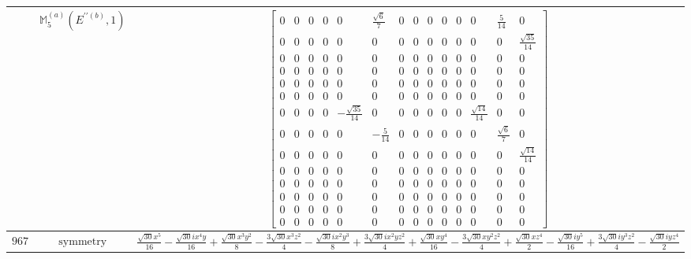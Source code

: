 \documentclass[fleqn,8pt,landscape]{jsarticle}
\begin{document}
\begin{longtable}{ccc}
$  $ & $ \mathbb{M}_{5}^{(a)}(E^{\prime\prime(b)},1) $ & $ \begin{bmatrix} 0 & 0 & 0 & 0 & 0 & \frac{\sqrt{6}}{7} & 0 & 0 & 0 & 0 & 0 & 0 & \frac{5}{14} & 0 \\ 0 & 0 & 0 & 0 & 0 & 0 & 0 & 0 & 0 & 0 & 0 & 0 & 0 & \frac{\sqrt{35}}{14} \\ 0 & 0 & 0 & 0 & 0 & 0 & 0 & 0 & 0 & 0 & 0 & 0 & 0 & 0 \\ 0 & 0 & 0 & 0 & 0 & 0 & 0 & 0 & 0 & 0 & 0 & 0 & 0 & 0 \\ 0 & 0 & 0 & 0 & 0 & 0 & 0 & 0 & 0 & 0 & 0 & 0 & 0 & 0 \\ 0 & 0 & 0 & 0 & 0 & 0 & 0 & 0 & 0 & 0 & 0 & 0 & 0 & 0 \\ 0 & 0 & 0 & 0 & - \frac{\sqrt{35}}{14} & 0 & 0 & 0 & 0 & 0 & 0 & \frac{\sqrt{14}}{14} & 0 & 0 \\ 0 & 0 & 0 & 0 & 0 & - \frac{5}{14} & 0 & 0 & 0 & 0 & 0 & 0 & \frac{\sqrt{6}}{7} & 0 \\ 0 & 0 & 0 & 0 & 0 & 0 & 0 & 0 & 0 & 0 & 0 & 0 & 0 & \frac{\sqrt{14}}{14} \\ 0 & 0 & 0 & 0 & 0 & 0 & 0 & 0 & 0 & 0 & 0 & 0 & 0 & 0 \\ 0 & 0 & 0 & 0 & 0 & 0 & 0 & 0 & 0 & 0 & 0 & 0 & 0 & 0 \\ 0 & 0 & 0 & 0 & 0 & 0 & 0 & 0 & 0 & 0 & 0 & 0 & 0 & 0 \\ 0 & 0 & 0 & 0 & 0 & 0 & 0 & 0 & 0 & 0 & 0 & 0 & 0 & 0 \\ 0 & 0 & 0 & 0 & 0 & 0 & 0 & 0 & 0 & 0 & 0 & 0 & 0 & 0 \end{bmatrix} $ \\ \hline
$ 967 $ & $ \text{symmetry} $ & $ \frac{\sqrt{30} x^{5}}{16} - \frac{\sqrt{30} i x^{4} y}{16} + \frac{\sqrt{30} x^{3} y^{2}}{8} - \frac{3 \sqrt{30} x^{3} z^{2}}{4} - \frac{\sqrt{30} i x^{2} y^{3}}{8} + \frac{3 \sqrt{30} i x^{2} y z^{2}}{4} + \frac{\sqrt{30} x y^{4}}{16} - \frac{3 \sqrt{30} x y^{2} z^{2}}{4} + \frac{\sqrt{30} x z^{4}}{2} - \frac{\sqrt{30} i y^{5}}{16} + \frac{3 \sqrt{30} i y^{3} z^{2}}{4} - \frac{\sqrt{30} i y z^{4}}{2} $ \\

\end{longtable}
\end{document}
